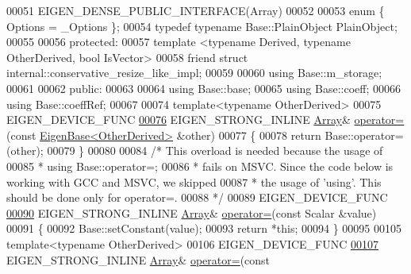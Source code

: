 \begin{DoxyCode}
00051     EIGEN\_DENSE\_PUBLIC\_INTERFACE(Array)
00052 
00053     \textcolor{keyword}{enum} \{ Options = \_Options \};
00054     \textcolor{keyword}{typedef} \textcolor{keyword}{typename} Base::PlainObject PlainObject;
00055 
00056   \textcolor{keyword}{protected}:
00057     \textcolor{keyword}{template} <\textcolor{keyword}{typename} Derived, \textcolor{keyword}{typename} OtherDerived, \textcolor{keywordtype}{bool} IsVector>
00058     \textcolor{keyword}{friend} \textcolor{keyword}{struct }internal::conservative\_resize\_like\_impl;
00059 
00060     \textcolor{keyword}{using} Base::m\_storage;
00061 
00062   \textcolor{keyword}{public}:
00063 
00064     \textcolor{keyword}{using} Base::base;
00065     \textcolor{keyword}{using} Base::coeff;
00066     \textcolor{keyword}{using} Base::coeffRef;
00067 
00074     \textcolor{keyword}{template}<\textcolor{keyword}{typename} OtherDerived>
00075     EIGEN\_DEVICE\_FUNC
\hyperlink{group___core___module_aed9cf975768953131c28096c84952a08}{00076}     EIGEN\_STRONG\_INLINE \hyperlink{group___core___module_class_eigen_1_1_array}{Array}& \hyperlink{group___core___module_aed9cf975768953131c28096c84952a08}{operator=}(\textcolor{keyword}{const} 
      \hyperlink{group___core___module_struct_eigen_1_1_eigen_base}{EigenBase<OtherDerived>} &other)
00077     \{
00078       \textcolor{keywordflow}{return} Base::operator=(other);
00079     \}
00080 
00084     \textcolor{comment}{/* This overload is needed because the usage of}
00085 \textcolor{comment}{      *   using Base::operator=;}
00086 \textcolor{comment}{      * fails on MSVC. Since the code below is working with GCC and MSVC, we skipped}
00087 \textcolor{comment}{      * the usage of 'using'. This should be done only for operator=.}
00088 \textcolor{comment}{      */}
00089     EIGEN\_DEVICE\_FUNC
\hyperlink{group___core___module_ab77cffb759a431d4a55ed150e850805a}{00090}     EIGEN\_STRONG\_INLINE \hyperlink{group___core___module_class_eigen_1_1_array}{Array}& \hyperlink{group___core___module_ab77cffb759a431d4a55ed150e850805a}{operator=}(\textcolor{keyword}{const} Scalar &value)
00091     \{
00092       Base::setConstant(value);
00093       \textcolor{keywordflow}{return} *\textcolor{keyword}{this};
00094     \}
00095 
00105     \textcolor{keyword}{template}<\textcolor{keyword}{typename} OtherDerived>
00106     EIGEN\_DEVICE\_FUNC
\hyperlink{group___core___module_a8415de9a2e74e018c98d6e6271b307a5}{00107}     EIGEN\_STRONG\_INLINE \hyperlink{group___core___module_class_eigen_1_1_array}{Array}& \hyperlink{group___core___module_a8415de9a2e74e018c98d6e6271b307a5}{operator=}(\textcolor{keyword}{const} 

\end{DoxyCode}
